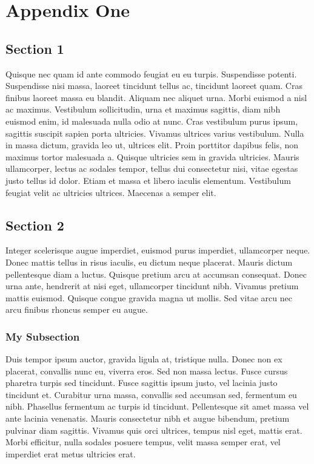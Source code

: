 \chapter{Appendix One}
\label{cha:appendix_one}

\section{Section 1}
\label{sec:section_1}
    Quisque nec quam id ante commodo feugiat eu eu turpis. Suspendisse potenti. Suspendisse nisi massa, laoreet tincidunt tellus ac, tincidunt laoreet quam. Cras finibus laoreet massa eu blandit. Aliquam nec aliquet urna. Morbi euismod a nisl ac maximus. Vestibulum sollicitudin, urna et maximus sagittis, diam nibh euismod enim, id malesuada nulla odio at nunc. Cras vestibulum purus ipsum, sagittis suscipit sapien porta ultricies. Vivamus ultrices varius vestibulum. Nulla in massa dictum, gravida leo ut, ultrices elit. Proin porttitor dapibus felis, non maximus tortor malesuada a. Quisque ultricies sem in gravida ultricies. Mauris ullamcorper, lectus ac sodales tempor, tellus dui consectetur nisi, vitae egestas justo tellus id dolor. Etiam et massa et libero iaculis elementum. Vestibulum feugiat velit ac ultricies ultrices. Maecenas a semper elit.

\section{Section 2}
\label{sec:section_2}
    Integer scelerisque augue imperdiet, euismod purus imperdiet, ullamcorper neque. Donec mattis tellus in risus iaculis, eu dictum neque placerat. Mauris dictum pellentesque diam a luctus. Quisque pretium arcu at accumsan consequat. Donec urna ante, hendrerit at nisi eget, ullamcorper tincidunt nibh. Vivamus pretium mattis euismod. Quisque congue gravida magna ut mollis. Sed vitae arcu nec arcu finibus rhoncus semper eu augue.

    \subsection{My Subsection}
    \label{sub:my_subsection}
        Duis tempor ipsum auctor, gravida ligula at, tristique nulla. Donec non ex placerat, convallis nunc eu, viverra eros. Sed non massa lectus. Fusce cursus pharetra turpis sed tincidunt. Fusce sagittis ipsum justo, vel lacinia justo tincidunt et. Curabitur urna massa, convallis sed accumsan sed, fermentum eu nibh. Phasellus fermentum ac turpis id tincidunt. Pellentesque sit amet massa vel ante lacinia venenatis. Mauris consectetur nibh et augue bibendum, pretium pulvinar diam sagittis. Vivamus quis orci ultrices, tempus nisl eget, mattis erat. Morbi efficitur, nulla sodales posuere tempus, velit massa semper erat, vel imperdiet erat metus ultricies erat.

